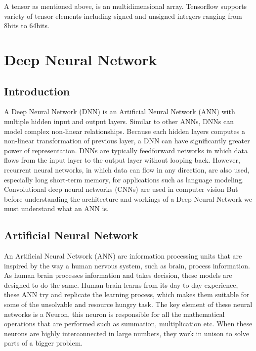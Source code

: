 \documentclass[12pt, a4paper]{report}
\begin{document}
A tensor as mentioned above, is an multidimensional array. Tensorflow supports variety of tensor elements including signed and unsigned integers ranging from 8bits to 64bits.

\clearpage

\chapter{Deep Neural Network}\label{ref:DNN} 

\section{Introduction}\label{sec:intro_dnn}

A Deep Neural Network (DNN) is an Artificial Neural Network (ANN) with multiple hidden input and output layers. Similar to other ANNs, DNNs can model complex non-linear relationships. Because each hidden layers computes a non-linear transformation of previous layer, a DNN can have significantly greater power of representation. DNNs are typically feedforward networks in which data flows from the input layer to the output layer without looping back. However, recurrent neural networks, in which data can flow in any direction, are also used, especially long short-term memory, for applications such as language modeling. Convolutional deep neural networks (CNNs) are used in computer vision But before understanding the architecture and workings of a Deep Neural Network we must understand what an ANN is. \\ \par

\section{Artificial Neural Network}\label{ANN}
An Artificial Neural Network (ANN) are information processing units that are inspired by the way a human nervous system, such as brain, process information. As human brain processes information and takes decision, these models are designed to do the same. Human brain learns from its day to day experience, these ANN try and replicate the learning process, which makes them suitable for some of the unsolvable and resource hungry task. The key element of these neural networks is a Neuron, this neuron is responsible for all the mathematical operations that are performed such as summation, multiplication etc. When these neurons are highly interconnected in large numbers, they work in unison to solve parts of a bigger problem.\\ \par
\end{document}
